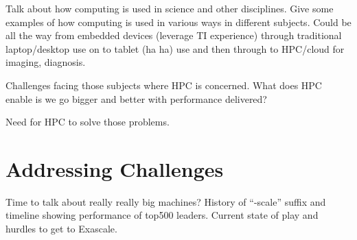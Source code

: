 Talk about how computing is used in science and other disciplines.
Give some examples of how computing is used in various ways in
different subjects.  Could be all the way from embedded devices
(leverage TI experience) through traditional laptop/desktop use on to
tablet (ha ha) use and then through to HPC/cloud for imaging,
diagnosis.

Challenges facing those subjects where HPC is concerned.  What does
HPC enable is we go bigger and better with performance delivered?

Need for HPC to solve those problems.

\section{Addressing Challenges}

Time to talk about really really big machines?  History of ``-scale''
suffix and timeline showing performance of top500 leaders.  Current
state of play and hurdles to get to Exascale.

